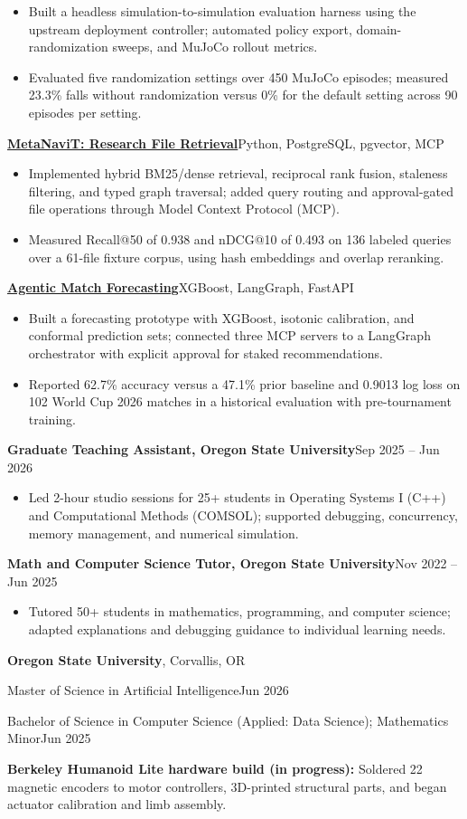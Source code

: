 \documentclass[letterpaper,10pt]{article}
\newcommand{\resumeSection}[1]{\par\vspace{7pt}{\large\bfseries #1}\par\vspace{3pt}}
\newcommand{\project}[3]{\par\vspace{3pt}\textbf{\href{#2}{#1}}\enspace\textbar\enspace #3\par}
\newcommand{\resumeItem}[1]{\item #1}
\begin{document}
\begin{itemize}
\resumeItem{Built a headless simulation-to-simulation evaluation harness using the upstream deployment controller; automated policy export, domain-randomization sweeps, and MuJoCo rollout metrics.}
\resumeItem{Evaluated five randomization settings over 450 MuJoCo episodes; measured 23.3\% falls without randomization versus 0\% for the default setting across 90 episodes per setting.}
\end{itemize}
\project{MetaNaviT: Research File Retrieval}{https://github.com/joses2017smjh/MetaNavT}{Python, PostgreSQL, pgvector, MCP}
\begin{itemize}
\resumeItem{Implemented hybrid BM25/dense retrieval, reciprocal rank fusion, staleness filtering, and typed graph traversal; added query routing and approval-gated file operations through Model Context Protocol (MCP).}
\resumeItem{Measured Recall@50 of 0.938 and nDCG@10 of 0.493 on 136 labeled queries over a 61-file fixture corpus, using hash embeddings and overlap reranking.}
\end{itemize}
\project{Agentic Match Forecasting}{https://github.com/joses2017smjh/Agentic-Soccer-Match-Prediction-MCP}{XGBoost, LangGraph, FastAPI}
\begin{itemize}
\resumeItem{Built a forecasting prototype with XGBoost, isotonic calibration, and conformal prediction sets; connected three MCP servers to a LangGraph orchestrator with explicit approval for staked recommendations.}
\resumeItem{Reported 62.7\% accuracy versus a 47.1\% prior baseline and 0.9013 log loss on 102 World Cup 2026 matches in a historical evaluation with pre-tournament training.}
\end{itemize}
\resumeSection{Experience}
\textbf{Graduate Teaching Assistant, Oregon State University}\enspace\textbar\enspace Sep 2025 -- Jun 2026\par
\begin{itemize}
\resumeItem{Led 2-hour studio sessions for 25+ students in Operating Systems I (C++) and Computational Methods (COMSOL); supported debugging, concurrency, memory management, and numerical simulation.}
\end{itemize}
\textbf{Math and Computer Science Tutor, Oregon State University}\enspace\textbar\enspace Nov 2022 -- Jun 2025\par
\begin{itemize}
\resumeItem{Tutored 50+ students in mathematics, programming, and computer science; adapted explanations and debugging guidance to individual learning needs.}
\end{itemize}
\resumeSection{Education}
\textbf{Oregon State University}, Corvallis, OR\par
Master of Science in Artificial Intelligence\enspace\textbar\enspace Jun 2026\par
Bachelor of Science in Computer Science (Applied: Data Science); Mathematics Minor\enspace\textbar\enspace Jun 2025\par
\resumeSection{Additional Experience}
\textbf{Berkeley Humanoid Lite hardware build (in progress):} Soldered 22 magnetic encoders to motor controllers, 3D-printed structural parts, and began actuator calibration and limb assembly.
\end{document}
